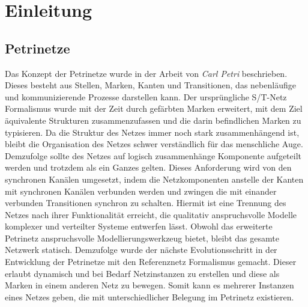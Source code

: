 \chapter{Einleitung}

\section{Petrinetze} %
Das Konzept der Petrinetze wurde in der Arbeit von \textit{Carl Petri} beschrieben. 
Dieses besteht aus Stellen, Marken, Kanten und Transitionen, das nebenläufige und kommunizierende Prozesse darstellen kann.
Der ursprüngliche S/T-Netz Formalismus wurde mit der Zeit durch gefärbten Marken erweitert, mit dem Ziel äquivalente Strukturen zusammenzufassen und die darin befindlichen Marken zu typisieren.
Da die Struktur des Netzes immer noch stark zusammenhängend ist, bleibt die Organisation des Netzes schwer verständlich für das menschliche Auge. \newline 
Demzufolge sollte des Netzes auf logisch zusammenhänge Komponente aufgeteilt werden und trotzdem als ein Ganzes gelten.
Dieses Anforderung wird von den synchronen Kanälen umgesetzt, indem die Netzkomponenten anstelle der Kanten mit synchronen Kanälen verbunden werden und zwingen die mit einander verbunden Transitionen synchron zu schalten.
Hiermit ist eine Trennung des Netzes nach ihrer Funktionalität erreicht, die qualitativ anspruchsvolle Modelle komplexer und verteilter Systeme entwerfen lässt.\bigbreak
Obwohl das erweiterte Petrinetz anspruchsvolle Modellierungswerkzeug bietet, bleibt das gesamte Netzwerk statisch.
Demzufolge wurde der nächste Evolutionsschritt in der Entwicklung der Petrinetze mit den Referenznetz Formalismus gemacht. 
Dieser erlaubt dynamisch und bei Bedarf Netzinstanzen zu erstellen und diese als Marken in einem anderen Netz zu bewegen. 
Somit kann es mehrerer Instanzen eines Netzes geben, die mit unterschiedlicher Belegung im Petrinetz existieren. 

